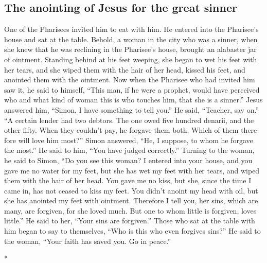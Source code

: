 \begin{paracol}{2}
\begin{otherlanguage}{english}
\hypertarget{the-anointing-of-jesus-for-the-great-sinner}{%
\subsection{The anointing of Jesus for the great
sinner}\label{the-anointing-of-jesus-for-the-great-sinner}}

 One of the Pharisees invited him to eat with him. He
entered into the Pharisee's house and sat at the table. 
Behold, a woman in the city who was a sinner, when she knew that he was
reclining in the Pharisee's house, brought an alabaster jar of ointment.
 Standing behind at his feet weeping, she began to wet
his feet with her tears, and she wiped them with the hair of her head,
kissed his feet, and anointed them with the ointment. 
Now when the Pharisee who had invited him saw it, he said to himself,
``This man, if he were a prophet, would have perceived who and what kind
of woman this is who touches him, that she is a sinner.''
 Jesus answered him, ``Simon, I have something to tell
you.'' He said, ``Teacher, say on.''  ``A certain lender
had two debtors. The one owed five hundred denarii, and the other fifty.
 When they couldn't pay, he forgave them both. Which of
them therefore will love him most?''  Simon answered,
``He, I suppose, to whom he forgave the most.'' He said to him, ``You
have judged correctly.''  Turning to the woman, he said
to Simon, ``Do you see this woman? I entered into your house, and you
gave me no water for my feet, but she has wet my feet with her tears,
and wiped them with the hair of her head.  You gave me no
kiss, but she, since the time I came in, has not ceased to kiss my feet.
 You didn't anoint my head with oil, but she has anointed
my feet with ointment.  Therefore I tell you, her sins,
which are many, are forgiven, for she loved much. But one to whom little
is forgiven, loves little.''  He said to her, ``Your sins
are forgiven.''  Those who sat at the table with him
began to say to themselves, ``Who is this who even forgives sins?''
 He said to the woman, ``Your faith has saved you. Go in
peace.''

\end{otherlanguage}

\switchcolumn[0]*

\hypertarget{el-compauxf1ero-constante-de-jesuxfas-en-sus-andanzas-las-sirvientas-galileas}{%
}
\end{paracol}
